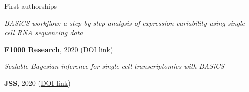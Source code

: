 


\begin{cventries}


\cventry
{First authorships} %
{} %
{} %
{} %
{ %
    \begin{cvitems}
        \item {
            \begin{flushleft}
                \textit{
                    BASiCS workflow: a step-by-step analysis of expression 
                    variability using single cell RNA sequencing data
                }
            \end{flushleft}
            \textbf{F1000 Research}, 2020
            (\href{not yet}{DOI link})
        }
        \item {
            \begin{flushleft}
                \textit{
                    Scalable Bayesian inference for single cell transcriptomics
                    with BASiCS
                }
            \end{flushleft}
            \textbf{JSS}, 2020
            (\href{not yet}{DOI link})
        }
    \end{cvitems}
}


\end{cventries}
